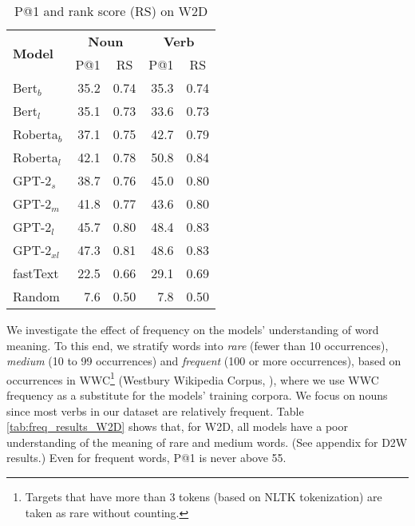 \documentclass[11pt,a4paper]{article}
\begin{document}
\begin{table}
    \centering
    \begin{tabular}{l|rrrr}
        \hline
         \multirow{2}{*}{\textbf{Model}} & \multicolumn{2}{c}{\textbf{Noun}} & \multicolumn{2}{c}{\textbf{Verb}} \\
         & \multicolumn{1}{c}{P@1} & \multicolumn{1}{c}{RS} & \multicolumn{1}{c}{P@1} & \multicolumn{1}{c}{RS} \\ \hline
     Bert$_{b}$ & 35.2 & 0.74 & 35.3 & 0.74 \\
     Bert$_{l}$ & 35.1 & 0.73 & 33.6 & 0.73 \\
     Roberta$_{b}$ & 37.1 & 0.75 & 42.7 & 0.79 \\
     Roberta$_{l}$ & 42.1 & 0.78 & 50.8 & 0.84 \\ \hline
     GPT-2$_{s}$ & 38.7 & 0.76 & 45.0 & 0.80 \\
     GPT-2$_{m}$ & 41.8 & 0.77 & 43.6 & 0.80 \\
     GPT-2$_{l}$ & 45.7 & 0.80 & 48.4 & 0.83 \\
     GPT-2$_{xl}$ & 47.3 & 0.81 & 48.6 & 0.83 \\
     \hline 
     fastText & 22.5 & 0.66 & 29.1 & 0.69 \\ \hline 
     Random & 7.6 & 0.50 & 7.8 & 0.50 \\\hline
     
    \end{tabular}
    \caption{P@1 and rank score (RS) on W2D}
    \label{tab:results_W2D}
\end{table}


We investigate the effect of frequency on the models' understanding of word meaning.
To this end, we stratify words into \textit{rare} (fewer than 10 occurrences), \textit{medium} (10 to 99 occurrences) and \textit{frequent} (100 or more occurrences), based on occurrences in WWC\footnote{Targets that have more than 3 tokens (based on NLTK tokenization) are taken as rare without counting.} (Westbury Wikipedia Corpus, ), where we use WWC frequency as a substitute for the models' training corpora. 
We focus on nouns since most verbs in our dataset are relatively frequent. 
Table \ref{tab:freq_results_W2D} shows that, for W2D, all models have a poor understanding of the meaning of rare and medium words. (See appendix for D2W results.) 
Even for frequent words, P@1 is never above 55.
\end{document}
